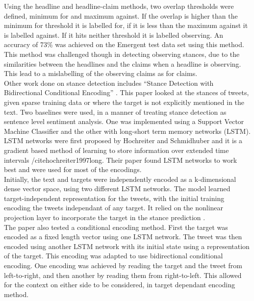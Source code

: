 \documentclass[11pt,a4paper]{article}
\begin{document}
Using the headline and headline-claim methods, two overlap thresholds were defined, minimum for and maximum against. If the overlap is higher than the minimum for threshold it is labelled for, if it is less than the maximum against it is labelled against. If it hits neither threshold it is labelled observing. An accuracy of 73\% was achieved on the Emergent test data set using this method. This method was challenged though in detecting observing stances, due to the similarities between the headlines and the claims when a headline is observing. This lead to a mislabelling of the observing claims as for claims. \\

Other work done on stance detection includes “Stance Detection with Bidirectional Conditional Encoding” \cite{augenstein2016stance}. This paper looked at the stances of tweets, given sparse training data or where the target is not explicitly mentioned in the text. Two baselines were used, in a manner of treating stance detection as sentence level sentiment analysis. One was implemented using a Support Vector Machine Classifier and the other with long-short term memory networks (LSTM). LSTM networks were first proposed by Hochreiter and Schmidhuber and it is a gradient based method of learning to store information over extended time intervals /cite{hochreiter1997long}. Their paper found LSTM networks to work best and were used for most of the encodings. \\

Initially, the text and targets were independently encoded as a k-dimensional dense vector space, using two different LSTM networks. The model learned target-independent representation for the tweets, with the initial training encoding the tweets independant of any target. It relied on the nonlinear projection layer to incorporate the target in the stance prediction \cite{augenstein2016stance}. \\

The paper also tested a conditional encoding method. First the target was encoded as a fixed length vector using one LSTM network. The tweet was then encoded using another LSTM network with its initial state using a representation of the target. This encoding was adapted to use bidirectional conditional encoding. One encoding was achieved by reading the target and the tweet from left-to-right, and then another by reading them from right-to-left. This allowed for the context on either side to be considered, in target dependant encoding method. \\
\end{document}
